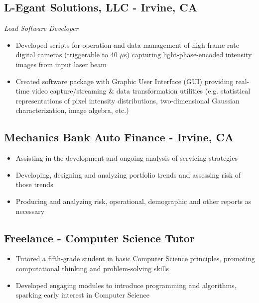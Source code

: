 \documentclass[11pt,a4paper]{article}
\newenvironment{myitemize}
{ \begin{itemize}[label={--}, leftmargin=*]
    \setlength{\itemsep}{0pt}
    \setlength{\parskip}{0pt}
    \setlength{\parsep}{0pt}     }
{ \end{itemize}                  }
\begin{document}
\subsection*{L-Egant Solutions, LLC - Irvine, CA \hfill {} }
\vspace{-1.5mm} %
\textit{Lead Software Developer}
\vspace{-1.5mm} %
\begin{myitemize}
\item Developed scripts for operation and data management of high frame rate digital cameras (triggerable to 40 $\mu$s) capturing light-phase-encoded intensity images from input laser beam
\item Created software package with Graphic User Interface (GUI) providing real-time video capture/streaming \& data transformation utilities (e.g. statistical representations of pixel intensity distributions, two-dimensional Gaussian characterization, image algebra, etc.)
\end{myitemize}

\subsection*{Mechanics Bank Auto Finance - Irvine, CA \hfill {} }

\begin{myitemize}
\item Assisting in the development and ongoing analysis of servicing strategies
\item Developing, designing and analyzing portfolio trends and assessing risk of those trends
\item Producing and analyzing risk, operational, demographic and other reports as necessary
\end{myitemize}


\subsection*{Freelance - Computer Science Tutor \hfill {} }

\begin{myitemize}
\item Tutored a fifth-grade student in basic Computer Science  principles, promoting computational thinking and problem-solving skills
\item Developed engaging modules to introduce programming and algorithms, sparking early interest in Computer Science
\end{myitemize}
\end{document}

